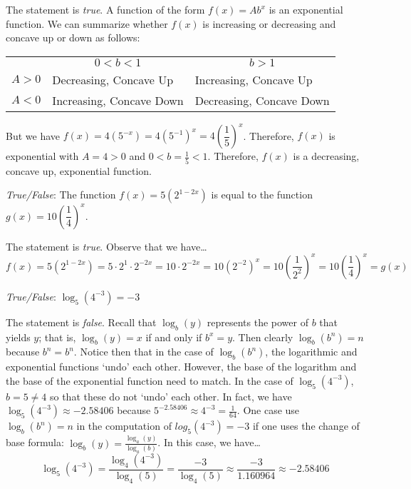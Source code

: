 \documentclass[11pt,letterpaper]{article}
\begin{document}
\sol The statement is \textit{true}. A function of the form $f(x)= Ab^x$ is an exponential function. We can summarize whether $f(x)$ is increasing or decreasing and concave up or down as follows:
        \begin{table}[!ht]
        \centering
        \begin{tabular}{cll}
        \multicolumn{1}{l}{} & \multicolumn{1}{c}{$0 < b < 1$} & \multicolumn{1}{c}{$b > 1$} \\ \cline{2-3} 
        \multicolumn{1}{c|}{$A > 0$} & \multicolumn{1}{l|}{Decreasing, Concave Up} & \multicolumn{1}{l|}{Increasing, Concave Up} \\ \cline{2-3} 
        \multicolumn{1}{c|}{$A < 0$} & \multicolumn{1}{l|}{Increasing, Concave Down} & \multicolumn{1}{l|}{Decreasing, Concave Down} \\ \cline{2-3} 
        \end{tabular}
        \end{table}	
But we have $f(x)= 4(5^{-x})= 4 (5^{-1})^x= 4 \left( \dfrac{1}{5} \right)^x$. Therefore, $f(x)$ is exponential with $A= 4 > 0$ and $0 < b= \frac{1}{5} < 1$. Therefore, $f(x)$ is a decreasing, concave up, exponential function. \pvspace{1.3cm}



\quizsol \textit{True/False}: The function $f(x)= 5(2^{1 - 2x})$ is equal to the function $g(x)= 10 \left( \dfrac{1}{4} \right)^x$. \pspace

\sol The statement is \textit{true}. Observe that we have\dots
	\[
	f(x)= 5(2^{1 - 2x})= 5 \cdot 2^1 \cdot 2^{-2x}= 10 \cdot 2^{-2x}= 10 (2^{-2})^x= 10 \left( \dfrac{1}{2^2} \right)^x= 10 \left( \dfrac{1}{4} \right)^x= g(x)
	\]



\newpage



\quizsol \textit{True/False}: $\log_5(4^{-3})= -3$ \pspace

\sol The statement is \textit{false}. Recall that $\log_b(y)$ represents the power of $b$ that yields $y$; that is, $\log_b(y)= x$ if and only if $b^x= y$. Then clearly $\log_b(b^n)= n$ because $b^n= b^n$. Notice then that in the case of $\log_b(b^n)$, the logarithmic and exponential functions `undo' each other. However, the base of the logarithm and the base of the exponential function need to match. In the case of $\log_5(4^{-3})$, $b= 5 \neq 4$ so that these do not `undo' each other. In fact, we have $\log_5(4^{-3}) \approx -2.58406$ because $5^{-2.58406} \approx 4^{-3}= \frac{1}{64}$. One case use $\log_b(b^n)= n$ in the computation of $log_5(4^{-3})= -3$ if one uses the change of base formula: $\log_b(y)= \frac{\log_a(y)}{\log_a(b)}$. In this case, we have\dots
	\[
	\log_5(4^{-3})= \dfrac{\log_4(4^{-3})}{\log_4(5)}= \dfrac{-3}{\log_4(5)} \approx \dfrac{-3}{1.160964} \approx -2.58406
	\] \pvspace{1.3cm}
\end{document}
